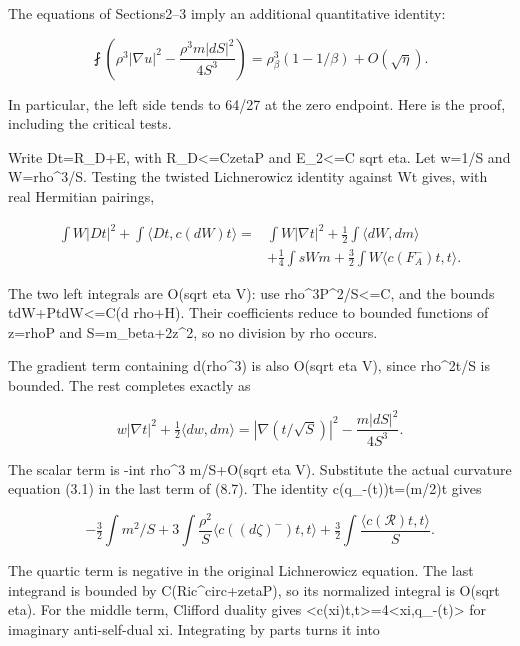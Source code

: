 \documentclass[
  10pt,
]{article}
\begin{document}
The equations of Sections2--3 imply an additional quantitative identity:

\[
 \boxed{\fint\left(\rho^3|\nabla u|^2-
            \frac{\rho^3m|dS|^2}{4S^3}\right)
       =\rho_\beta^3(1-1/\beta)+O(\sqrt\eta).}         \tag{8.6}
\]

In particular, the left side tends to 64/27 at the zero endpoint. Here
is the proof, including the critical tests.

Write Dt=R\_D+E, with
\textbar R\_D\textbar\textless=C\textbar zeta\textbar\textbar P\textbar{}
and \textbar\textbar E\textbar\textbar\_2\textless=C sqrt eta. Let w=1/S
and W=rho\^{}3/S. Testing the twisted Lichnerowicz identity against Wt
gives, with real Hermitian pairings,

\[
\begin{aligned}
 \int W|Dt|^2+\int\langle Dt,c(dW)t\rangle
  ={}&\int W|\nabla t|^2+\tfrac12\int\langle dW,dm\rangle\\
    &+\tfrac14\int sWm
      +\tfrac32\int W\langle c(F_A^-)t,t\rangle.       
\end{aligned}\tag{8.7}
\]

The two left integrals are O(sqrt eta V): use
rho\^{}3\textbar P\textbar\^{}2/S\textless=C, and the bounds
\textbar t\textbar\textbar dW\textbar+\textbar P\textbar\textbar t\textbar\textbar dW\textbar\textless=C(\textbar d
rho\textbar+\textbar H\textbar). Their coefficients reduce to bounded
functions of z=rho\textbar P\textbar{} and S=m\_beta+2z\^{}2, so no
division by rho occurs.

The gradient term containing d(rho\^{}3) is also O(sqrt eta V), since
rho\^{}2\textbar t\textbar/S is bounded. The rest completes exactly as

\[
 w|\nabla t|^2+\tfrac12\langle dw,dm\rangle
   =|\nabla(t/\sqrt S)|^2-\frac{m|dS|^2}{4S^3}.       \tag{8.8}
\]

The scalar term is -int rho\^{}3 m/S+O(sqrt eta V). Substitute the
actual curvature equation (3.1) in the last term of (8.7). The identity
c(q\_-(t))t=(m/2)t gives

\[
 -\tfrac32\int m^2/S
 +3\int\frac{\rho^2}{S}\langle c((d\zeta)^-)t,t\rangle
 +\tfrac32\int\frac{\langle c(\mathcal R)t,t\rangle}{S}. \tag{8.9}
\]

The quartic term is negative in the original Lichnerowicz equation. The
last integrand is bounded by
C(\textbar Ric\^{}circ\textbar+\textbar zeta\textbar\textbar P\textbar),
so its normalized integral is O(sqrt eta). For the middle term, Clifford
duality gives
\textless c(xi)t,t\textgreater=4\textless xi,q\_-(t)\textgreater{} for
imaginary anti-self-dual xi. Integrating by parts turns it into
\end{document}
